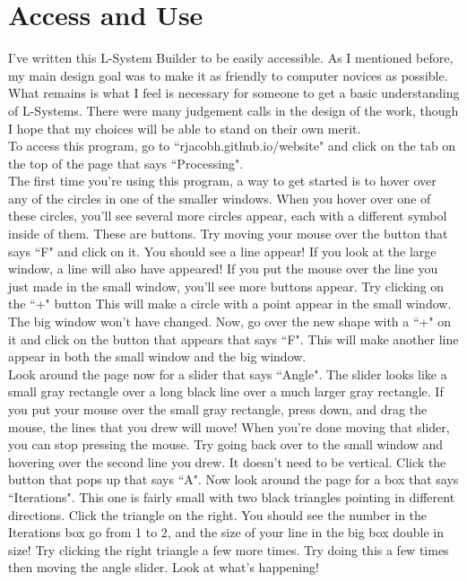 \documentclass[12pt,twoside]{reedthesis}
\begin{document}
\section{Access and Use}

	I've written this L-System Builder to be easily accessible. As I mentioned before, my main design goal was to make it as friendly to computer novices as possible. What remains is what I feel is necessary for someone to get a basic understanding of L-Systems. There were many judgement calls in the design of the work, though I hope that my choices will be able to stand on their own merit.\\
	
	To access this program, go to ``rjacobh.github.io/website" and click on the tab on the top of the page that says ``Processing".\\ %
	
	The first time you're using this program, a way to get started is to hover over any of the circles in one of the smaller windows. When you hover over one of these circles, you'll see several more circles appear, each with a different symbol inside of them. These are buttons. Try moving your mouse over the button that says ``F" and click on it. You should see a line appear! If you look at the large window, a line will also have appeared! If you put the mouse over the line you just made in the small window, you'll see more buttons appear. Try clicking on the ``+" button This will make a circle with a point appear in the small window. The big window won't have changed. Now, go over the new shape with a ``+" on it and click on the button that appears that says ``F". This will make another line appear in both the small window and the big window.\\
	
	Look around the page now for a slider that says ``Angle". The slider looks like a small gray rectangle over a long black line over a much larger gray rectangle. If you put your mouse over the small gray rectangle, press down, and drag the mouse, the lines that you drew will move! When you're done moving that slider, you can stop pressing the mouse. Try going back over to the small window and hovering over the second line you drew. It doesn't need to be vertical. Click the button that pops up that says ``A". Now look around the page for a box that says ``Iterations". This one is fairly small with two black triangles pointing in different directions. Click the triangle on the right. You should see the number in the Iterations box go from 1 to 2, and the size of your line in the big box double in size! Try clicking the right triangle a few more times. Try doing this a few times then moving the angle slider. Look at what's happening!\\
	
\end{document}
